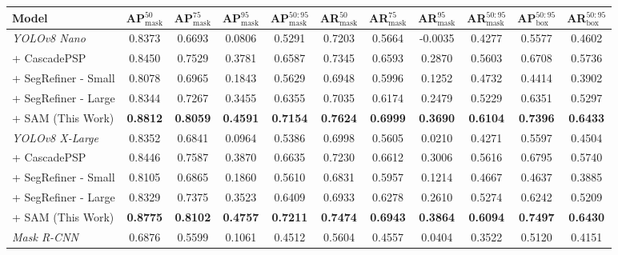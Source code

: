 \begin{table*}[h!]
\centering
\begin{adjustbox}{width=\textwidth}
\begin{tabular}{@{}l|c|c|c|c|c|c|c|c|c|c@{}}
\toprule
\textbf{Model} & \textbf{AP$^{50}_{\text{mask}}$} & \textbf{AP$^{75}_{\text{mask}}$} & \textbf{AP$^{95}_{\text{mask}}$} & \textbf{AP$^{50:95}_{\text{mask}}$} & \textbf{AR$^{50}_{\text{mask}}$} & \textbf{AR$^{75}_{\text{mask}}$} & \textbf{AR$^{95}_{\text{mask}}$} & \textbf{AR$^{50:95}_{\text{mask}}$} & \textbf{AP$^{50:95}_{\text{box}}$} & \textbf{AR$^{50:95}_{\text{box}}$} \\ \midrule
\textit{YOLOv8 Nano} \cite{yolov8architecture} & 0.8373 & 0.6693 & 0.0806 & 0.5291 & 0.7203 & 0.5664 & -0.0035 & 0.4277 & 0.5577 & 0.4602 \\
+ CascadePSP \cite{cheng2020cascadepsp} & 0.8450 & 0.7529 & 0.3781 & 0.6587 & 0.7345 & 0.6593 & 0.2870 & 0.5603 & 0.6708 & 0.5736 \\
+ SegRefiner - Small \cite{wang2023segrefiner} & 0.8078 & 0.6965 & 0.1843 & 0.5629 & 0.6948 & 0.5996 & 0.1252 & 0.4732 & 0.4414 & 0.3902 \\
+ SegRefiner - Large \cite{wang2023segrefiner} & 0.8344 & 0.7267 & 0.3455 & 0.6355 & 0.7035 & 0.6174 & 0.2479 & 0.5229 & 0.6351 & 0.5297 \\
+ SAM (This Work) & \textbf{0.8812} & \textbf{0.8059} & \textbf{0.4591} & \textbf{0.7154} & \textbf{0.7624} & \textbf{0.6999} & \textbf{0.3690} & \textbf{0.6104} & \textbf{0.7396} & \textbf{0.6433} \\
\midrule
\textit{YOLOv8 X-Large} \cite{yolov8architecture} & 0.8352 & 0.6841 & 0.0964 & 0.5386 & 0.6998 & 0.5605 & 0.0210 & 0.4271 & 0.5597 & 0.4504 \\
+ CascadePSP \cite{cheng2020cascadepsp} & 0.8446 & 0.7587 & 0.3870 & 0.6635 & 0.7230 & 0.6612 & 0.3006 & 0.5616 & 0.6795 & 0.5740 \\
+ SegRefiner - Small \cite{wang2023segrefiner} & 0.8105 & 0.6865 & 0.1860 & 0.5610 & 0.6831 & 0.5957 & 0.1214 & 0.4667 & 0.4637 & 0.3885 \\
+ SegRefiner - Large \cite{wang2023segrefiner} & 0.8329 & 0.7375 & 0.3523 & 0.6409 & 0.6933 & 0.6278 & 0.2610 & 0.5274 & 0.6242 & 0.5209 \\
+ SAM (This Work) & \textbf{0.8775} & \textbf{0.8102} & \textbf{0.4757} & \textbf{0.7211} & \textbf{0.7474} & \textbf{0.6943} & \textbf{0.3864} & \textbf{0.6094} & \textbf{0.7497} & \textbf{0.6430} \\
\midrule
\textit{Mask R-CNN} \cite{he2017mask} & 0.6876 & 0.5599 & 0.1061 & 0.4512 & 0.5604 & 0.4557 & 0.0404 & 0.3522 & 0.5120 & 0.4151 \\

\end{tabular}
\end{adjustbox}
\end{table*}
